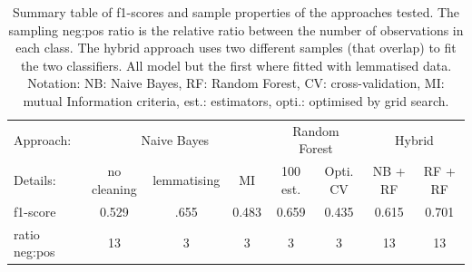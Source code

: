 \documentclass[a4paper, justified]{tufte-handout}
\begin{document}
\begin{fullwidth}
\newpage
\begin{table}\label{scores}
\begin{tabular}{l|ccc|cc|cc}
Approach:                                                        & \multicolumn{3}{c|}{Naive Bayes}   & \multicolumn{2}{c|}{Random Forest} & \multicolumn{2}{c}{Hybrid} \\
Details:                                                         & no cleaning & lemmatising & MI    & 100 est.         & Opti. CV        & NB + RF      & RF + RF      \\ \hline
f1-score                                 & 0.529        & .655        & 0.483 & 0.659            & 0.435           & 0.615        & 0.701       \\
ratio neg:pos & 13           & 3           & 3     & 3                & 3               & 13       & 13     \\
   
\end{tabular}
\vspace{1cm}
\caption{Summary table of f1-scores and sample properties of the approaches tested. The sampling neg:pos ratio is the relative ratio between the number of observations in each class. The hybrid approach uses two different samples (that overlap) to fit the two classifiers. All model but the first where fitted with lemmatised data. Notation: NB: Naive Bayes, RF: Random Forest, CV: cross-validation, MI: mutual Information criteria, est.: estimators, opti.: optimised by grid search. }
\end{table}






\end{fullwidth}
\end{document}
